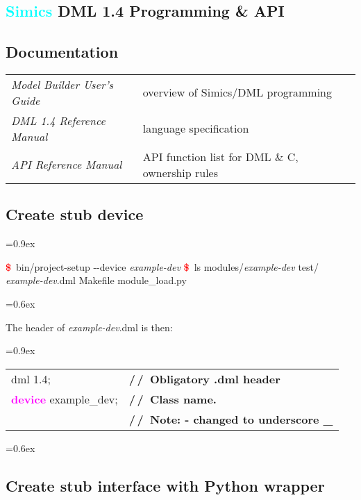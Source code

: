 \documentclass[8pt]{extarticle}
\newenvironment{code}[1][]{%
\begin{prebox}[#1]\obeylines%
\fontdimen2\font=0.9ex%
}{%
\end{prebox}%
\fontdimen2\font=0.6ex%
}
\newcommand{\prompt}{\textcolor{red}{\textbf{\$}\ }}
\newcommand{\kw}[1]{\textcolor{magenta}{\textbf{#1}}}
\newcommand{\cmtcommon}[1]{\textcolor{Sepia}{\textbf{#1}}}
\newcommand{\cmtd}[1]{\cmtcommon{/\,/\ #1}}
\newcommand{\p}[1]{\textit{\large#1}}
\newcommand{\Simics}{\textcolor{cyan}{\textbf{Simics}}}
\newlength{\MyLen}
\begin{document}
\begin{multicols*}{3}
\newpage

\section{\Simics{} DML 1.4 Programming \& API}

\subsection{Documentation}
\begin{tabular}{p{\the\MyLen}p{\linewidth-\the\MyLen-0.8cm}}
    \textit{Model Builder User’s Guide} & overview of Simics/DML
    programming \\
    \textit{DML 1.4 Reference Manual} & language specification \\
    \textit{API Reference Manual} & API function list for DML \& C,
    ownership rules
\end{tabular}

\subsection{Create stub device}

\begin{code}
    \prompt bin/project-setup -{}-device \p{example-dev}
    \prompt ls modules/\p{example-dev}
    test/  \p{example-dev}.dml  Makefile  module\_load.py
\end{code}

The header of \p{example-dev}.dml is then:

\begin{code}
    \begin{tabular}{ll}
        dml 1.4;                  & \cmtd{Obligatory .dml header} \\
        \kw{device} example\_dev; & \cmtd{Class name.} \\
                                  & \cmtd{Note: - changed to underscore \_}
    \end{tabular}
\end{code}

\subsection{Create stub interface with Python wrapper}


\end{multicols*}
\end{document}
